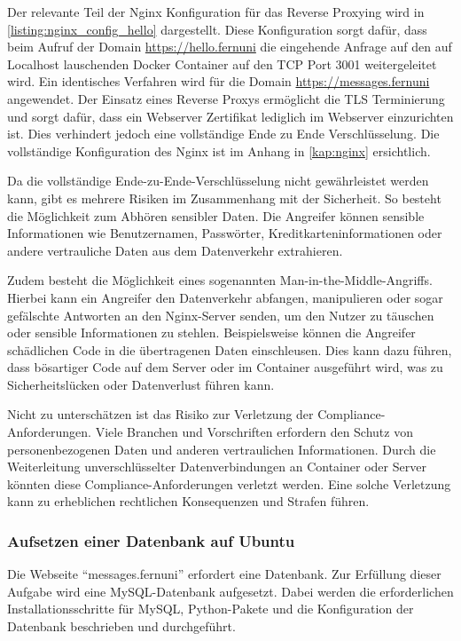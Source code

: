 Der relevante Teil der Nginx Konfiguration für das Reverse Proxying wird in \autoref{listing:nginx_config_hello} dargestellt. Diese Konfiguration sorgt dafür, dass beim Aufruf der Domain \url{https://hello.fernuni} die eingehende Anfrage auf den auf Localhost lauschenden Docker Container auf den \ac{TCP} Port 3001 weitergeleitet wird. Ein identisches Verfahren wird für die Domain \url{https://messages.fernuni} angewendet. Der Einsatz eines Reverse Proxys ermöglicht die TLS Terminierung und sorgt dafür, dass ein Webserver Zertifikat lediglich im Webserver einzurichten ist. Dies verhindert jedoch eine vollständige Ende zu Ende Verschlüsselung. Die vollständige Konfiguration des Nginx ist im Anhang in \autoref{kap:nginx} ersichtlich.

Da die vollständige Ende-zu-Ende-Verschlüsselung nicht gewährleistet werden kann, gibt es mehrere Risiken im Zusammenhang mit der Sicherheit. So besteht die Möglichkeit zum Abhören sensibler Daten. Die Angreifer können sensible Informationen wie Benutzernamen, Passwörter, Kreditkarteninformationen oder andere vertrauliche Daten aus dem Datenverkehr extrahieren.

Zudem besteht die Möglichkeit eines sogenannten Man-in-the-Middle-Angriffs. Hierbei kann ein Angreifer den Datenverkehr abfangen, manipulieren oder sogar gefälschte Antworten an den Nginx-Server senden, um den Nutzer zu täuschen oder sensible Informationen zu stehlen. Beispielsweise können die Angreifer schädlichen Code in die übertragenen Daten einschleusen. Dies kann dazu führen, dass bösartiger Code auf dem Server oder im Container ausgeführt wird, was zu Sicherheitslücken oder Datenverlust führen kann.

Nicht zu unterschätzen ist das Risiko zur Verletzung der Compliance-Anforderungen. Viele Branchen und Vorschriften erfordern den Schutz von personenbezogenen Daten und anderen vertraulichen Informationen. Durch die Weiterleitung unverschlüsselter Datenverbindungen an Container oder Server könnten diese Compliance-Anforderungen verletzt werden. Eine solche Verletzung kann zu erheblichen rechtlichen Konsequenzen und Strafen führen. 

\subsubsection{Aufsetzen einer Datenbank auf Ubuntu}

Die Webseite \enquote{messages.fernuni} erfordert eine Datenbank. Zur Erfüllung dieser Aufgabe wird eine MySQL-Datenbank aufgesetzt. Dabei werden die erforderlichen Installationsschritte für MySQL, Python-Pakete und die Konfiguration der Datenbank beschrieben und durchgeführt.

